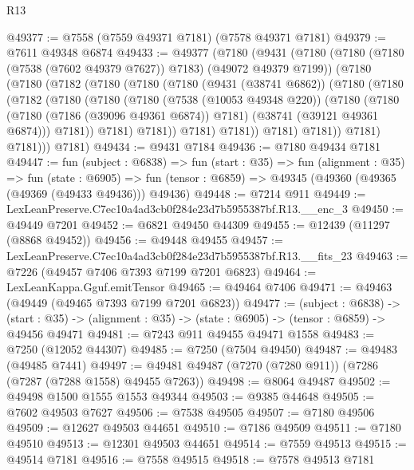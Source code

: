 \begin{lexlean}{R13}
\begin{coremodule}
@49377 := @7558 (@7559 @49371 @7181) (@7578 @49371 @7181)
@49379 := @7611 @49348 @6874
@49433 := @49377
    (@7180
      (@9431
        (@7180
          (@7180 (@7180 (@7538 (@7602 @49379 @7627)) @7183) (@49072 @49379 @7199))
          (@7180
            (@7180
              (@7182
                (@7180
                  (@7180
                    (@7180
                      (@9431 (@38741 @6862))
                      (@7180
                        (@7180
                          (@7182
                            (@7180
                              (@7180
                                (@7180
                                  (@7538 (@10053 @49348 @220))
                                  (@7180
                                    (@7180
                                      (@7180 (@7186 (@39096 @49361 @6874)) @7181)
                                      (@38741 (@39121 @49361 @6874)))
                                    @7181))
                                @7181)
                              @7181))
                          @7181)
                        @7181))
                    @7181)
                  @7181))
              @7181)
            @7181)))
      @7181)
@49434 := @9431 @7184
@49436 := @7180 @49434 @7181
@49447 := fun (subject : @6838) =>
  fun (start : @35) =>
  fun (alignment : @35) =>
  fun (state : @6905) =>
  fun (tensor : @6859) => @49345 (@49360 (@49365 (@49369 (@49433 @49436))) @49436)
@49448 := @7214 @911
@49449 := LexLeanPreserve.C7ec10a4ad3cb0f284e23d7b5955387bf.R13.__enc_3
@49450 := @49449 @7201
@49452 := @6821 @49450 @44309
@49455 := @12439 (@11297 (@8868 @49452))
@49456 := @49448 @49455
@49457 := LexLeanPreserve.C7ec10a4ad3cb0f284e23d7b5955387bf.R13.__fits_23
@49463 := @7226 (@49457 @7406 @7393 @7199 @7201 @6823)
@49464 := LexLeanKappa.Gguf.emitTensor
@49465 := @49464 @7406
@49471 := @49463 (@49449 (@49465 @7393 @7199 @7201 @6823))
@49477 := (subject : @6838) ->
  (start : @35) -> (alignment : @35) -> (state : @6905) -> (tensor : @6859) -> @49456 @49471
@49481 := @7243 @911 @49455 @49471 @1558
@49483 := @7250 (@12052 @44307)
@49485 := @7250 (@7504 @49450)
@49487 := @49483 (@49485 @7441)
@49497 := @49481 @49487 (@7270 (@7280 @911)) (@7286 (@7287 (@7288 @1558) @49455 @7263))
@49498 := @8064 @49487
@49502 := @49498 @1500 @1555 @1553 @49344
@49503 := @9385 @44648
@49505 := @7602 @49503 @7627
@49506 := @7538 @49505
@49507 := @7180 @49506
@49509 := @12627 @49503 @44651
@49510 := @7186 @49509
@49511 := @7180 @49510
@49513 := @12301 @49503 @44651
@49514 := @7559 @49513
@49515 := @49514 @7181
@49516 := @7558 @49515
@49518 := @7578 @49513 @7181

\end{coremodule}
\end{lexlean}
